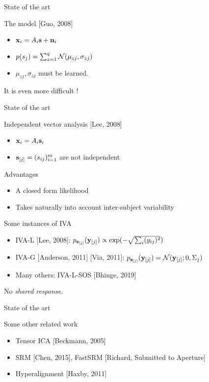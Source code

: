 \documentclass[bigger]{beamer}
\begin{document}
\begin{frame}{State of the art}
  \begin{block}{The model [Guo, 2008]}
    \begin{itemize}
    \item $\mathbf{x}_i = A_i\mathbf{s} + \mathbf{n}_i$
    \item $p(s_j) = \sum_{z=1}^q \mathcal{N}(\mu_{zj}, \sigma_{zj})$
    \item $\mu_{zj}, \sigma_{zj}$ must be learned.
    \end{itemize}
  \end{block}

  It is even more difficult !
\end{frame}


\begin{frame}{State of the art}
  \begin{block}{Independent vector analysis [Lee, 2008]}
    \begin{itemize}
    \item $\mathbf{x}_i = A_i \mathbf{s}_i$
    \item $\mathbf{s}_{[j]} = (s_{ij})_{i=1}^m$ are not independent
      \end{itemize}
  \end{block}

  \pause
  \begin{block}{Advantages}
    \begin{itemize}
  \item A closed form likelihood
  \item Takes naturally into account inter-subject variability
    \end{itemize}
  \end{block}

  \pause
  \begin{block}{Some instances of IVA}
    \begin{itemize}
  \item IVA-L [Lee, 2008]: $p_{\mathbf{s}_{[j]}}(\mathbf{y}_{[j]}) \propto \exp(-\sqrt{\sum_i (y_{ij})^2})$
  \item IVA-G [Anderson, 2011] [Via, 2011]: $p_{\mathbf{s}_{[j]}}(\mathbf{y}_{[j]}) = \mathcal{N}( \mathbf{y}_{[j]}; 0, \Sigma_j)$
  \item Many others: IVA-L-SOS [Bhinge, 2019]
    \end{itemize}
  \end{block}
  \pause
  No \emph{shared response}.
\end{frame}

\begin{frame}{State of the art}
  \begin{block}{Some other related work}
    \begin{itemize}
    \item Tensor ICA [Beckmann, 2005]
    \item SRM [Chen, 2015], FastSRM [Richard, Submitted to Aperture]
    \item Hyperalignment [Haxby, 2011]
    \end{itemize}
  \end{block}
\end{frame}
\end{document}
